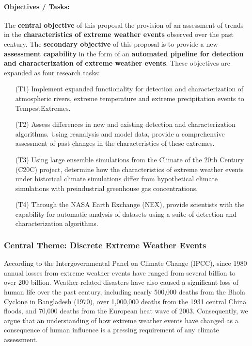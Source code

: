 \documentclass[11pt]{article}
\begin{document}
\paragraph{Objectives / Tasks:}  The \textbf{central objective} of this proposal the provision of an assessment of trends in the \textbf{characteristics of extreme weather events} observed over the past century.  The \textbf{secondary objective} of this proposal is to provide a new \textbf{assessment capability} in the form of an \textbf{automated pipeline for detection and characterization of extreme weather events}.  These objectives are expanded as four research tasks: 
\begin{itemize}
\item[(T1)] Implement expanded functionality for detection and characterization of atmospheric rivers, extreme temperature and extreme precipitation events to TempestExtremes.

\item[(T2)] Assess differences in new and existing detection and characterization algorithms.  Using reanalysis and model data, provide a comprehensive assessment of past changes in the characteristics of these extremes.

\item[(T3)] Using large ensemble simulations from the Climate of the 20th Century (C20C) project, determine how the characteristics of extreme weather events under historical climate simulations differ from hypothetical climate simulations with preindustrial greenhouse gas concentrations.


\item[(T4)] Through the NASA Earth Exchange (NEX), provide scientists with the capability for automatic analysis of datasets using a suite of detection and characterization algorithms. 
\end{itemize}


\subsubsection{Central Theme: Discrete Extreme Weather Events}

According to the Intergovernmental Panel on Climate Change (IPCC), since 1980 annual losses from extreme weather events have ranged from several billion to over 200 billion.  Weather-related disasters have also caused a significant loss of human life over the past century, including nearly 500,000 deaths from the Bhola Cyclone in Bangladesh (1970), over 1,000,000 deaths from the 1931 central China floods, and 70,000 deaths from the European heat wave of 2003.  Consequently, we argue that an understanding of how extreme weather events have changed as a consequence of human influence is a pressing requirement of any climate assessment.
\end{document}
